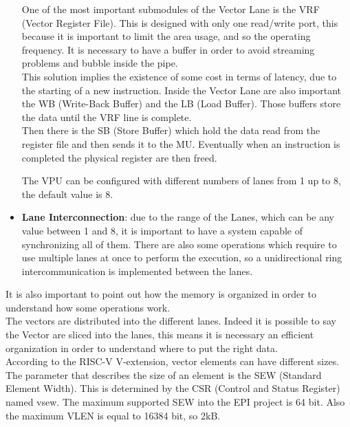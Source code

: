 \begin{itemize}
    One of the most important submodules of the Vector Lane is the VRF (Vector Register File). This is designed with only one read/write port, this because it is important to limit the area usage, and so the operating frequency. It is necessary to have a buffer in order to avoid streaming problems and bubble inside the pipe.\\
    
    This solution implies the existence of some cost in terms of latency, due to the starting of a new instruction.
    Inside the Vector Lane are also important the WB (Write-Back Buffer) and the LB (Load Buffer). Those buffers store the data until the VRF line is complete.\\
    Then there is the SB (Store Buffer) which hold the data read from the  register file and then sends it to the MU. 
    Eventually when an instruction is completed the physical register are then freed. 
    
    The VPU can be configured with different numbers of lanes from 1 up to 8, the default value is 8.\\
    
    \item \textbf{Lane Interconnection}: due to the range of the Lanes, which can be any value between 1 and 8, it is important to have a system capable of synchronizing all of them. There are also some operations which require to use multiple lanes at once to perform the execution, so a unidirectional ring intercommunication is implemented between the lanes.
\end{itemize}

It is also important to point out how the memory is organized in order to understand how some operations work.\\

The vectors are distributed into the different lanes. Indeed it is possible to say the Vector are sliced into the lanes, this means it is necessary an efficient organization in order to understand where to put the right data.\\


According to the RISC-V V-extension, vector elements can have different sizes. The parameter that describes the size of an element is the SEW (Standard Element Width). This is determined by the CSR (Control and Status Register) named vsew. The maximum supported SEW into the EPI project is 64 bit. Also the maximum VLEN is equal to 16384 bit, so 2kB.\\

